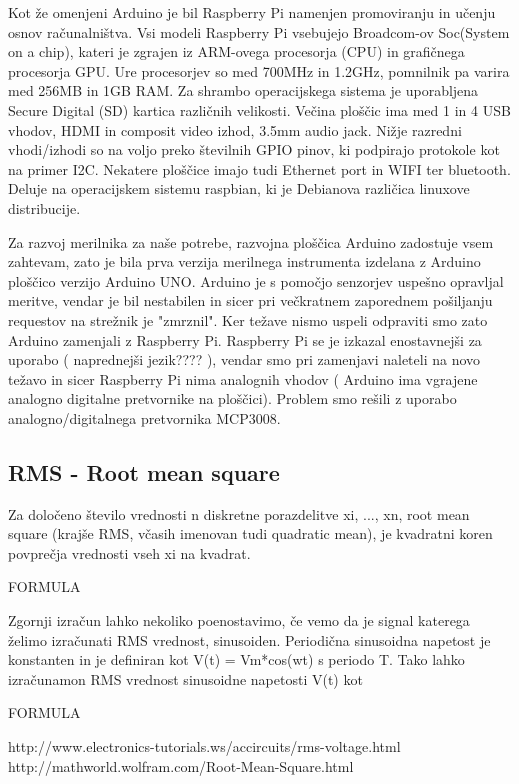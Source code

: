 \documentclass[12pt,a4paper,titlepage,openany]{report}
\begin{document}
Kot že omenjeni Arduino je bil Raspberry Pi namenjen promoviranju in učenju osnov računalništva. Vsi modeli Raspberry Pi vsebujejo Broadcom-ov Soc(System on a chip), kateri je zgrajen iz ARM-ovega procesorja (CPU) in grafičnega procesorja GPU. Ure procesorjev so med 700MHz in 1.2GHz, pomnilnik pa varira med 256MB in 1GB RAM. Za shrambo operacijskega sistema je uporabljena Secure Digital (SD) kartica različnih velikosti. Večina ploščic ima med 1 in 4 USB vhodov, HDMI in composit video izhod, 3.5mm audio jack. Nižje razredni vhodi/izhodi so na voljo preko številnih GPIO pinov, ki podpirajo protokole kot na primer I2C. Nekatere ploščice imajo tudi Ethernet port in WIFI ter bluetooth. Deluje na operacijskem sistemu raspbian, ki je Debianova različica linuxove distribucije.

Za razvoj merilnika za naše potrebe, razvojna ploščica Arduino zadostuje vsem zahtevam, zato je bila prva verzija merilnega instrumenta izdelana z Arduino ploščico verzijo Arduino UNO. Arduino je s pomočjo senzorjev uspešno opravljal meritve, vendar je bil nestabilen in sicer pri večkratnem zaporednem pošiljanju requestov na strežnik  je "zmrznil". Ker težave nismo uspeli odpraviti smo zato Arduino zamenjali z Raspberry Pi. Raspberry Pi se je izkazal enostavnejši za uporabo ( naprednejši jezik???? ), vendar smo pri zamenjavi naleteli na novo težavo in sicer Raspberry Pi nima analognih vhodov ( Arduino ima vgrajene analogno digitalne pretvornike na ploščici). Problem smo rešili z uporabo analogno/digitalnega pretvornika MCP3008.



\subsection{RMS - Root mean square}

Za določeno število vrednosti n diskretne porazdelitve xi, ..., xn, root mean square (krajše RMS, včasih imenovan tudi
quadratic mean), je kvadratni koren povprečja vrednosti vseh xi na kvadrat.

FORMULA

Zgornji izračun lahko nekoliko poenostavimo, če vemo da je signal katerega želimo izračunati RMS vrednost, sinusoiden.
Periodična sinusoidna napetost je konstanten in je definiran kot V(t) = Vm*cos(wt) s periodo T. Tako lahko izračunamon RMS
vrednost sinusoidne napetosti V(t) kot

FORMULA

http://www.electronics-tutorials.ws/accircuits/rms-voltage.html
http://mathworld.wolfram.com/Root-Mean-Square.html
\end{document}
